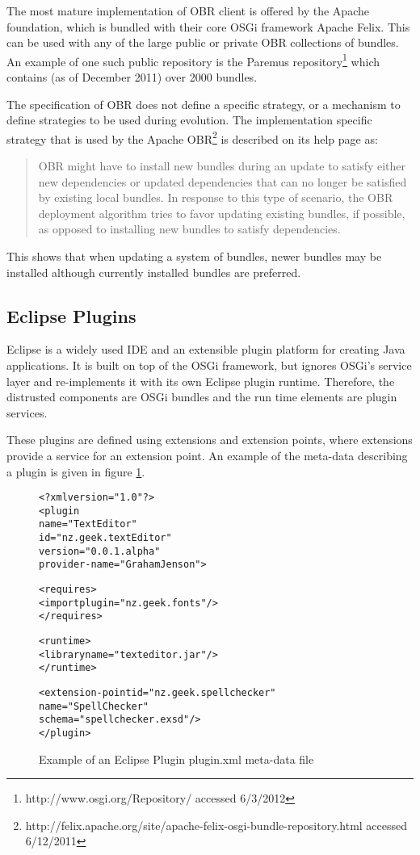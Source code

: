 The most mature implementation of OBR client is offered by the Apache foundation, which is bundled with their core OSGi framework Apache Felix. 
This can be used with any of the large public or private OBR collections of bundles.
An example of one such public repository is the Paremus repository\footnote{http://www.osgi.org/Repository/ accessed 6/3/2012} which contains (as of December 2011) over 2000 bundles.

The specification of OBR does not define a specific strategy, or a mechanism to define strategies to be used during evolution.
The implementation specific strategy that is used by the Apache OBR\footnote{http://felix.apache.org/site/apache-felix-osgi-bundle-repository.html accessed 6/12/2011} 
is described on its help page as:

\begin{quotation}
OBR might have to install new bundles during an update to satisfy either new dependencies or updated dependencies that can no longer be satisfied by existing local bundles. 
In response to this type of scenario, the OBR deployment algorithm tries to favor updating existing bundles, if possible, as opposed to installing new bundles to satisfy dependencies.
\end{quotation}

This shows that when updating a system of bundles, newer bundles may be installed although currently installed bundles are preferred.

\subsection{Eclipse Plugins}
Eclipse is a widely used IDE and an extensible plugin platform for creating Java applications.
It is built on top of the OSGi framework, but ignores OSGi's service layer and re-implements it with its own Eclipse plugin runtime.
Therefore, the distrusted components are OSGi bundles and the run time elements are plugin services.

These plugins are defined using extensions and extension points, where extensions provide a service for an extension point.
An example of the meta-data describing a plugin is given in figure \ref{eclipseplugin}. 

\begin{figure}[htp]
\begin{center}
\begin{alltt}
<?xml version="1.0"?>
<plugin
    name="Text Editor"
    id="nz.geek.textEditor"
    version="0.0.1.alpha"
    provider-name="Graham Jenson">
    
    <requires>
        <import plugin="nz.geek.fonts"/>
    </requires>

    <runtime>
        <library name="texteditor.jar"/>
    </runtime>
    
    <extension-point id="nz.geek.spellchecker" 
        name="Spell Checker" 
        schema="spellchecker.exsd"/>
</plugin>
\end{alltt}
  \caption[Eclipse Plugin meta-data]{Example of an Eclipse Plugin plugin.xml meta-data file}
  \label{eclipseplugin}
\end{center}
\end{figure}

